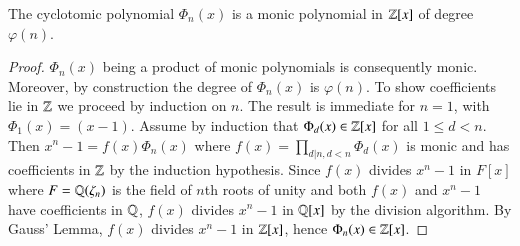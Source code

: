 \begin{lemma}
    The cyclotomic polynomial $\Phi_n(x)$ is a monic polynomial in $\mathbb Z[x]$ of degree $\varphi(n)$.
\end{lemma}
\begin{proof}
    $\Phi_n(x)$ being a product of monic polynomials is consequently monic. Moreover, by construction the degree of $\Phi_n(x)$ is $\varphi(n)$. To show coefficients lie in $\mathbb Z$ we proceed by induction on $n$. The result is immediate for $n = 1$, with $\Phi_1(x) = (x-1)$. Assume by induction that $\Phi_d(x) \in \mathbb Z[x]$ for all $1 \leq d < n$. Then $x^n - 1 = f(x)\Phi_n(x)$ where $f(x) = \prod_{d\vert n,d <n}\Phi_d(x)$ is monic and has coefficients in $\mathbb Z$ by the induction hypothesis. Since $f(x)$ divides $x^n -1$ in $F[x]$ where $F = \mathbb Q(\zeta_n)$ is the field of $n$th roots of unity and both $f(x)$ and $x^n-1$ have coefficients in $\mathbb Q$, $f(x)$ divides $x^n-1$ in $\mathbb Q[x]$ by the division algorithm. By Gauss' Lemma, $f(x)$ divides $x^n-1$ in $\mathbb Z[x]$, hence $\Phi_n(x) \in \mathbb Z[x]$.
\end{proof}


